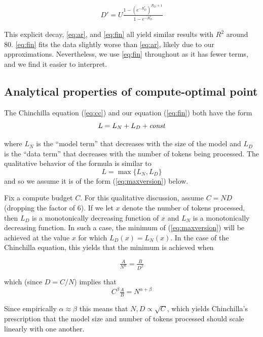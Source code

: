 \documentclass{article}
\begin{document}
\begin{equation}\label{eq:expdecay}
\begin{aligned}
D'=U\tfrac{1-(e^{-R_D^*})^{R_D + 1}}{1-e^{-R_D^*}}
\end{aligned}
\end{equation}

This explicit decay, \autoref{eq:ar}, and \autoref{eq:fin} all yield similar results with $R^{2}$ around 80. \autoref{eq:fin} fits the data slightly worse than \autoref{eq:ar}, likely due to our approximations. Nevertheless, we use \autoref{eq:fin} throughout as it has fewer terms, and we find it easier to interpret.

\FloatBarrier

\subsection{Analytical properties of compute-optimal point}


\iffalse
The Chinchilla equation (\autoref{eq:cc}) and our equation (\autoref{eq:fin}) both have the form 
\[
L = L_N + L_D + \text{\it  const}
\]

where $L_N$ is the ``model term'' that decreases with the size of the model and $L_D$ is the ``data term'' that decreases with the number of tokens being processed. The qualitative behavior of the formula is similar to
\begin{equation}
L = \max \{ L_N, L_D \} \label{eq:maxversion}
\end{equation}
and so we assume it is of the form (\autoref{eq:maxversion}) below.

Fix a compute budget $C$. For this qualitative discussion, assume $C=ND$ (dropping the factor of $6$). If we let $x$ denote the number of tokens processed, then $L_D$ is a monotonically decreasing function of $x$ and $L_N$ is a monotonically decreasing function. In such a case, the minimum of (\autoref{eq:maxversion}) will be achieved at the value $x$ for which $L_D(x)=L_N(x)$.
In the case of the Chinchilla equation, this yields that the minimum is achieved when 

\[
\tfrac{A}{N^\alpha} = \tfrac{B}{D^\beta}
\]

which (since $D=C/N$) implies that
\[
C^{\beta}\tfrac{A}{B} = N^{\alpha+\beta}
\]

Since empirically  $\alpha \approx \beta$ this means that $N,D \propto \sqrt{C}$, which yields Chinchilla's prescription that the model size and number of tokens processed should scale linearly with one another.
\end{document}
